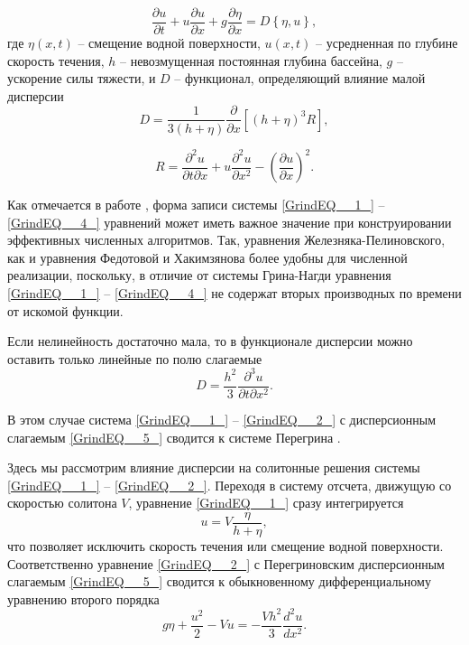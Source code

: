 \begin{equation} \label{GrindEQ__2_}
\frac{\partial u}{\partial t} +u\frac{\partial u}{\partial x} +g\frac{\partial \eta }{\partial x} =D\left\{\eta ,u\right\},
\end{equation}
где $\eta(x,t)$ -- смещение водной поверхности, $u(x,t)$ -- усредненная по глубине скорость течения, $h$ -- невозмущенная постоянная глубина бассейна, $g$ -- ускорение силы тяжести, и $D$ -- функционал, определяющий влияние малой дисперсии
\begin{equation} \label{GrindEQ__3_}
D=\frac{1}{3\left(h+\eta \right)} \frac{\partial }{\partial x} \left[\left(h+\eta \right)^{3} R\right],
\end{equation}

\begin{equation} \label{GrindEQ__4_}
R=\frac{\partial ^{2} u}{\partial t\partial x} +u\frac{\partial ^{2} u}{\partial x^{2} } -\left(\frac{\partial u}{\partial x} \right)^{2} .
\end{equation}


 Как отмечается в работе \cite{Fedotova_2008}, форма записи системы \eqref{GrindEQ__1_} -- \eqref{GrindEQ__4_} уравнений может иметь важное значение при конструировании эффективных численных алгоритмов. Так, уравнения Железняка-Пелиновского, как и уравнения Федотовой и Хакимзянова более удобны для численной реализации, поскольку, в отличие от системы Грина-Нагди уравнения \eqref{GrindEQ__1_} -- \eqref{GrindEQ__4_} не содержат вторых производных по времени от искомой функции.

Если нелинейность достаточно мала, то в функционале дисперсии можно оставить только линейные по полю слагаемые
\begin{equation} \label{GrindEQ__5_}
D=\frac{h^{2} }{3} \frac{\partial ^{3} u}{\partial t\partial x^{2} } .
\end{equation}

В этом случае система \eqref{GrindEQ__1_} -- \eqref{GrindEQ__2_} с дисперсионным слагаемым \eqref{GrindEQ__5_} сводится к системе Перегрина \cite{Peregrinde}.

Здесь мы рассмотрим влияние дисперсии на солитонные решения системы \eqref{GrindEQ__1_} -- \eqref{GrindEQ__2_}. Переходя в систему отсчета, движущую со скоростью солитона $V$, уравнение \eqref{GrindEQ__1_} сразу интегрируется
\begin{equation} \label{GrindEQ__7_}
u=V\frac{\eta }{h+\eta } ,
\end{equation}
что позволяет исключить скорость течения или смещение водной поверхности. Соответственно уравнение \eqref{GrindEQ__2_} с Перегриновским дисперсионным слагаемым \eqref{GrindEQ__5_} сводится к обыкновенному дифференциальному уравнению второго порядка
\begin{equation} \label{GrindEQ__8_}
g\eta +\frac{u^{2} }{2} -Vu=-\frac{Vh^{2} }{3} \frac{d^{2} u}{dx^{2} } .
\end{equation}

